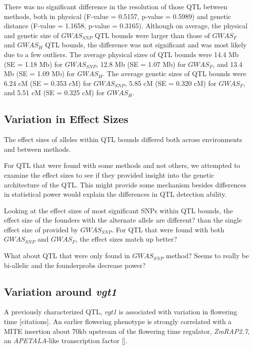 \documentclass[article,9pt,twocolumn,twoside]{rilabRxiv}
\begin{document}

There was no significant difference in the resolution of those QTL between methods, both in physical (F-value = 0.5157, p-value = 0.5989) and genetic distance (F-value = 1.1658, p-value = 0.3165). Although on average, the physical and genetic size of $GWAS_{SNP}$ QTL bounds were larger than those of $GWAS_F$ and $GWAS_H$ QTL bounds, the difference was not significant and was most likely due to a few outliers. The average physical sizes of QTL bounds were 14.4 Mb (SE = 1.18 Mb) for $GWAS_{SNP}$, 12.8 Mb (SE = 1.07 Mb) for $GWAS_F$, and 13.4 Mb (SE = 1.09 Mb) for $GWAS_H$. The average genetic sizes of QTL bounds were 6.24 cM (SE = 0.353 cM) for $GWAS_{SNP}$, 5.85 cM (SE = 0.320 cM) for $GWAS_F$, and 5.51 cM (SE = 0.325 cM) for $GWAS_H$.

\subsection{Variation in Effect Sizes}
The effect sizes of alleles within QTL bounds differed both across environments and between methods.

For QTL that were found with some methods and not others, we attempted to examine the effect sizes to see if they provided insight into the genetic architecture of the QTL. This might provide some mechanism besides differences in statistical power would explain the differences in QTL detection ability.

Looking at the effect sizes of most significant SNPs within QTL bounds, the effect size of the founders with the alternate allele are different? than the single effect size of provided by $GWAS_{SNP}$. For QTL that were found with both $GWAS_{SNP}$ and $GWAS_F$, the effect sizes match up better?

What about QTL that were only found in $GWAS_{SNP}$ method? Seems to really be bi-allelic and the founderprobs decrease power?



\subsection{Variation around \emph{vgt1}}
A previously characterized QTL, \emph{vgt1} is associated with variation in flowering time [citations]. An earlier flowering phenotype is strongly correlated with a MITE insertion about 70kb upstream of the flowering time regulator, \emph{ZmRAP2.7}, an \emph{APETALA}-like transcription factor [].
\end{document}
